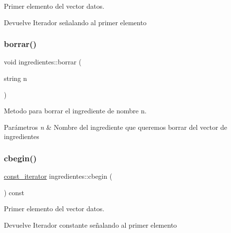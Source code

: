 Primer elemento del vector datos. 

\begin{DoxyReturn}{Devuelve}
Iterador señalando al primer elemento 
\end{DoxyReturn}
\mbox{\label{classingredientes_a71bde8efdf96c22f0f27ab9cc6e50466}} 
\subsubsection{\texorpdfstring{borrar()}{borrar()}}
{\footnotesize\ttfamily void ingredientes\+::borrar (\begin{DoxyParamCaption}\item[{string}]{n }\end{DoxyParamCaption})}



Metodo para borrar el ingrediente de nombre n. 


\begin{DoxyParams}{Parámetros}
{\em n} & Nombre del ingrediente que queremos borrar del vector de ingredientes \\
\hline
\end{DoxyParams}
\mbox{\label{classingredientes_a40fdccf1fc4542ea0774a79cfc83e070}} 
\subsubsection{\texorpdfstring{cbegin()}{cbegin()}}
{\footnotesize\ttfamily \hyperlink{classingredientes_ac84040efbb789929ebe9177605bb890a}{const\+\_\+iterator} ingredientes\+::cbegin (\begin{DoxyParamCaption}{ }\end{DoxyParamCaption}) const\hspace{0.3cm}{\ttfamily [inline]}}



Primer elemento del vector datos. 

\begin{DoxyReturn}{Devuelve}
Iterador constante señalando al primer elemento 
\end{DoxyReturn}
\mbox{\label{classingredientes_a5149813ebd368e888102e69b3d9c54e8}} 
